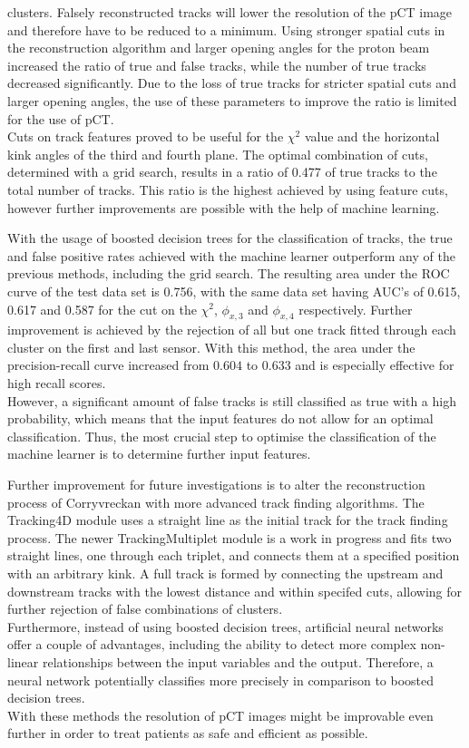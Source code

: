 clusters. Falsely reconstructed tracks will lower the resolution of the pCT image and therefore have to be reduced to a minimum. Using stronger spatial cuts
in the reconstruction algorithm and larger
opening angles for the proton beam increased the ratio of true and false tracks, while the number of true tracks decreased significantly. Due to the loss of
true tracks for stricter spatial cuts and larger opening angles, the use of these parameters to improve the ratio is limited for the use of pCT. \\
Cuts on track features proved to be useful for the $\chi^2$ value and the horizontal kink angles of the third and fourth plane.
The optimal combination of cuts, determined
with a grid search, results in a ratio of 0.477 of true tracks to the total number of tracks.
This ratio is the highest achieved by using feature cuts, however further improvements are possible
with the help of machine learning.

With the usage of boosted decision trees for the classification of tracks, the true and false positive rates achieved with the machine learner outperform any of the previous methods, including the grid search.
The resulting area under the ROC curve of the test data set is 0.756, with the same data set having AUC's of
0.615, 0.617 and 0.587 for the cut on the $\chi^2$, $\phi_{x,3}$ and $\phi_{x,4}$ respectively. Further improvement is achieved by the rejection of all but one track
fitted through each cluster on the first and last sensor.
With this method, the area under the precision-recall curve increased from $0.604$ to $0.633$ and is especially
effective for high recall scores. \\
However, a significant amount of false tracks is still classified as true
with a high probability, which means that the input features do not allow for an optimal classification.
Thus, the most crucial step to optimise the classification of the machine learner is to determine further input features.

Further improvement for future investigations
is to alter the reconstruction process of Corryvreckan with more advanced track finding algorithms.
The Tracking4D module uses a straight line as the initial track for
the track finding process. The newer TrackingMultiplet module is a work in progress and fits two straight lines,
one through each triplet, and connects them at a specified position with an arbitrary kink.
A full track is formed by connecting the upstream and downstream tracks with the lowest distance and within specifed cuts,
allowing for further rejection of false combinations of clusters. \\
Furthermore, instead of using boosted decision trees, artificial neural networks \cite{ann} offer a couple of advantages,
including the ability to detect more complex non-linear relationships between the input variables and the output. Therefore, a neural network potentially classifies
more precisely in comparison to boosted decision trees. \\
With these methods the resolution of pCT images might be improvable even further in order to treat patients as safe and efficient as possible.
